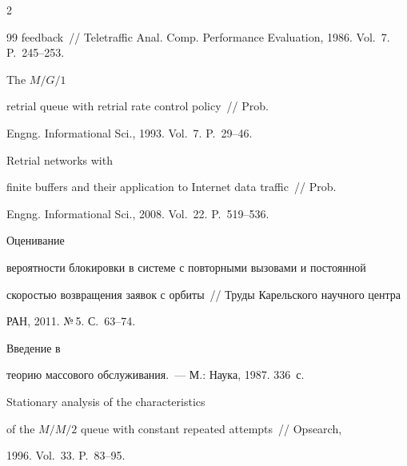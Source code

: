 \begin{multicols}{2}
{{\begin{thebibliography}{99}
    feedback~// Teletraffic Anal. Comp. Performance Evaluation,  1986. Vol.~7. P.~245--253.







 The $M/G/1$


    retrial queue with retrial rate control policy~// Prob. 


    Engng. Informational Sci.,  1993.  Vol.~7. P.~29--46.







 Retrial networks with


    finite buffers and their application to Internet data traffic~// Prob.


Engng. Informational Sci., 2008. Vol.~22. P.~519--536.







 Оценивание


    вероят\-ности блокировки в системе с повторными вызовами и постоянной


    скоростью возвращения заявок с орбиты~// Труды Карельского научного центра


    РАН, 2011.  №\,5. С.~63--74.


    




 Введение  в


    теорию массового обслуживания.~--- М.: Наука, 1987. 336~с.







 Stationary analysis of the characteristics


of the $M/M/2$ queue with constant repeated attempts~// Opsearch,


1996. Vol.~33. P.~83--95.





\label{end\stat}


    





\end{thebibliography}}}
\end{multicols}
